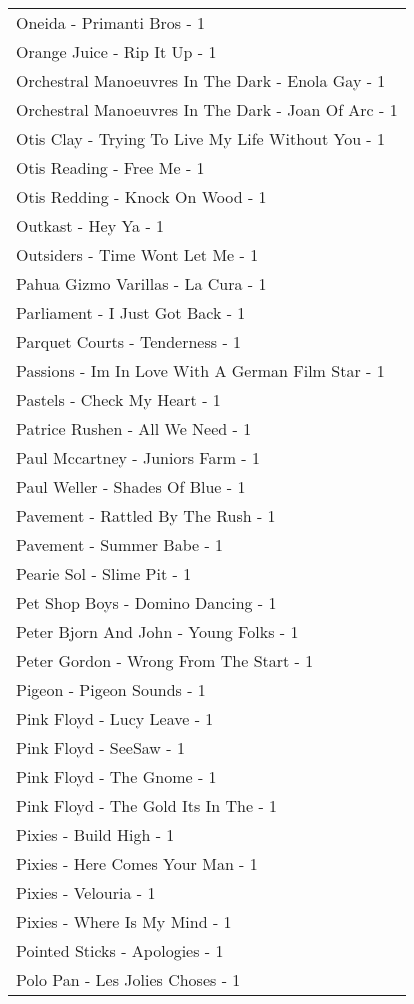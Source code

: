 \documentclass[
]{article}
\begin{document}
\begin{longtable}{l}
Oneida - Primanti Bros - 1 \\ 
Orange Juice - Rip It Up - 1 \\ 
Orchestral Manoeuvres In The Dark - Enola Gay - 1 \\ 
Orchestral Manoeuvres In The Dark - Joan Of Arc - 1 \\ 
Otis Clay - Trying To Live My Life Without You - 1 \\ 
Otis Reading - Free Me - 1 \\ 
Otis Redding - Knock On Wood - 1 \\ 
Outkast - Hey Ya - 1 \\ 
Outsiders - Time Wont Let Me - 1 \\ 
Pahua Gizmo Varillas - La Cura - 1 \\ 
Parliament - I Just Got Back - 1 \\ 
Parquet Courts - Tenderness - 1 \\ 
Passions - Im In Love With A German Film Star - 1 \\ 
Pastels - Check My Heart - 1 \\ 
Patrice Rushen - All We Need - 1 \\ 
Paul Mccartney - Juniors Farm - 1 \\ 
Paul Weller - Shades Of Blue - 1 \\ 
Pavement - Rattled By The Rush - 1 \\ 
Pavement - Summer Babe - 1 \\ 
Pearie Sol - Slime Pit - 1 \\ 
Pet Shop Boys - Domino Dancing - 1 \\ 
Peter Bjorn And John - Young Folks - 1 \\ 
Peter Gordon - Wrong From The Start - 1 \\ 
Pigeon - Pigeon Sounds - 1 \\ 
Pink Floyd - Lucy Leave - 1 \\ 
Pink Floyd - SeeSaw - 1 \\ 
Pink Floyd - The Gnome - 1 \\ 
Pink Floyd - The Gold Its In The - 1 \\ 
Pixies - Build High - 1 \\ 
Pixies - Here Comes Your Man - 1 \\ 
Pixies - Velouria - 1 \\ 
Pixies - Where Is My Mind - 1 \\ 
Pointed Sticks - Apologies - 1 \\ 
Polo Pan - Les Jolies Choses - 1 \\ 

\end{longtable}
\end{document}
